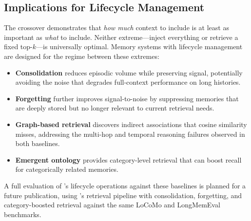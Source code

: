 \subsection{Implications for Lifecycle Management}

The crossover demonstrates that \emph{how much} context to include is at
least as important as \emph{what} to include. Neither extreme---inject
everything or retrieve a fixed top-$k$---is universally optimal. Memory
systems with lifecycle management are designed for the regime between these
extremes:

\begin{itemize}[nosep]
    \item \textbf{Consolidation} reduces episodic volume while preserving
    signal, potentially avoiding the noise that degrades full-context
    performance on long histories.
    \item \textbf{Forgetting} further improves signal-to-noise by
    suppressing memories that are deeply stored but no longer relevant to
    current retrieval needs.
    \item \textbf{Graph-based retrieval} discovers indirect associations
    that cosine similarity misses, addressing the multi-hop and temporal
    reasoning failures observed in both baselines.
    \item \textbf{Emergent ontology} provides category-level retrieval
    that can boost recall for categorically related memories.
\end{itemize}

\noindent A full evaluation of \alaya{}'s lifecycle operations against these
baselines is planned for a future publication, using \alaya{}'s retrieval
pipeline with consolidation, forgetting, and category-boosted retrieval
against the same LoCoMo and LongMemEval benchmarks.

